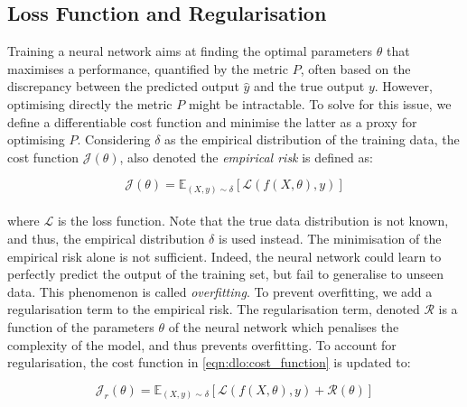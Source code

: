 
\subsection{Loss Function and Regularisation}
Training a neural network aims at finding the optimal parameters $\theta$ that
maximises a performance, quantified by the metric $P$, often based on the
discrepancy between the predicted output $\hat{y}$ and the true output $y$.
However, optimising directly the metric $P$ might be intractable. To solve for
this issue, we define a differentiable cost function and minimise the latter as
a proxy for optimising $P$. Considering $\delta$ as the empirical distribution
of the training data, the cost function $\mathcal{J}(\theta)$, also denoted the
\emph{empirical risk} is defined as:

\begin{equation}
  \label{eqn:dlo:cost_function}
  \mathcal{J}(\theta) = \mathds{E}_{(X, y) \sim \delta} \left[ \mathcal{L}(f(X,\theta), y) \right]
\end{equation}\\

\noindent where $\mathcal{L}$ is the loss function. Note that the true data
distribution is not known, and thus, the empirical distribution $\delta$ is used
instead. The minimisation of the empirical risk alone is not sufficient. Indeed,
the neural network could learn to perfectly predict the output of the training
set, but fail to generalise to unseen data. This phenomenon is called
\emph{overfitting}. To prevent overfitting, we add a regularisation term to the
empirical risk. The regularisation term, denoted $\mathcal{R}$ is a function of
the parameters $\theta$ of the neural network which penalises the complexity of
the model, and thus prevents overfitting. To account for regularisation, the
cost function in \cref{eqn:dlo:cost_function} is updated to:

\begin{equation}
  \label{eqn:dlo:regularised_cost_fn}
  \mathcal{J}_r(\theta) = \mathds{E}_{(X, y) \sim \delta} \left[ \mathcal{L}(f(X,\theta), y) + \mathcal{R}(\theta) \right]
\end{equation}\\

